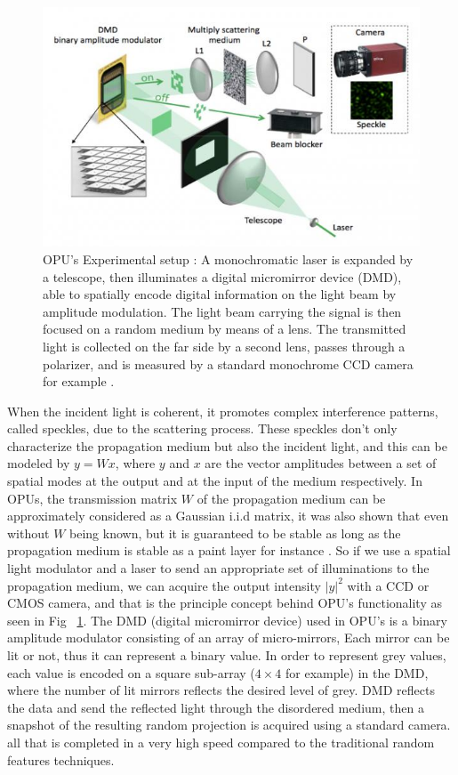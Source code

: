 \begin{figure}[ht!]
\begin{center}
\includegraphics[scale=0.5]{figs/lighton630.jpg}
\end{center}
\caption[OPU's Experimental setup]{OPU's Experimental setup \citep{saade_opu}: A monochromatic laser is expanded by a telescope, then
illuminates a digital micromirror device (DMD), able to spatially encode digital information on the light beam by
amplitude modulation. The light beam carrying the signal is then focused on a random
medium by means of a lens. The transmitted light is collected on the
far side by a second lens, passes through a polarizer, and is measured by a standard monochrome CCD camera for example .}
\label{fig_opu}
\end{figure}
When the incident light is coherent, it promotes complex interference patterns, called speckles, due to the scattering process.
These speckles don't only characterize the propagation medium but also the incident light, and this can be modeled by $y=Wx$, 
where $y$ and $x$ are the vector amplitudes between a set of spatial modes at the output and at the input of the medium respectively. In OPUs, the transmission matrix $W$ of the propagation medium can be approximately considered as a Gaussian i.i.d matrix, it was also shown that even without $W$ being known, but it is guaranteed to be stable as long as the propagation medium is stable as a paint layer for instance \citep{saade_opu}.  So if we use a spatial light modulator and a laser to send an appropriate set of illuminations to the propagation medium, we can acquire the output intensity $|y|^2$ with a CCD or CMOS camera, and that is the principle concept behind OPU's functionality as seen in Fig~ \ref{fig_opu}.\newline 
The DMD (digital micromirror device) used in OPU's is a binary amplitude modulator consisting of an array of micro-mirrors, Each mirror can be lit or not, thus it can represent  a binary value. In order to represent grey values, each value is encoded on a square sub-array ($4\times 4$ for example) in the DMD, where the number of lit mirrors reflects the desired level of grey. DMD reflects the data and send the reflected light through the disordered medium, then a snapshot of the resulting random projection is acquired using a standard camera. all that is completed in a very high speed compared to the traditional random features techniques. 

